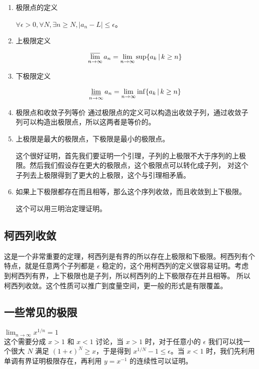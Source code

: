 \begin{enumerate}
    \item 极限点的定义

    $\forall \epsilon > 0, \forall N, \exists n \ge N, \lvert a_n - L\rvert \le \epsilon $。

    \item 上极限定义

\[
    \varlimsup_{n \to \infty} a_n = \lim_{n \to \infty} \sup \{ a_k \,\vert\, k \ge n\}
\]


    \item 下极限定义

\[
    \varliminf_{n \to \infty} a_n = \lim_{n \to \infty} \inf \{ a_k \,\vert\, k \ge n\}
\]

    \item 极限点和收敛子列等价
    通过极限点的定义可以构造出收敛子列，通过收敛子列可以构造出极限点，所以这两者是等价的。

    \item 上极限是最大的极限点，下极限是最小的极限点。

这个很好证明，首先我们要证明一个引理，子列的上极限不大于序列的上极限。然后我们假设存在更大的极限点，这个极限点可以转化成子列，
对这个子列去上极限得到了更大的上极限，这个与引理相矛盾。

    \item 如果上下极限都存在而且相等，那么这个序列收敛，而且收敛到上下极限。

    这个可以用三明治定理证明。
\end{enumerate}





\subsection{柯西列收敛}

这是一个非常重要的定理，柯西列是有界的所以存在上极限和下极限。柯西列有个特点，就是任意两个子列都是 $\epsilon$ 稳定的，这个用柯西列的定义很容易证明。考虑到柯西列有界，上下极限也是子列，所以柯西列的上下极限存在并且相等。
所以柯西列收敛。这个性质可以推广到度量空间，更一般的形式是有限覆盖。

\subsection{一些常见的极限}

$\lim_{n \to \infty}x^{1/n} = 1$ \\

这个需要分成 $x > 1$ 和 $x < 1 $ 讨论，当 $ x > 1$ 时，对于任意小的 $ \epsilon$ 我们可以找一个很大 $N$ 满足 $(1 + \epsilon) ^ N \ge x$，于是得到
$x^{1/N} - 1 \le  \epsilon$。当 $x < 1$ 时，我们先利用单调有界证明极限存在，再利用 $y=x^{-1}$ 的连续性可以证明。

